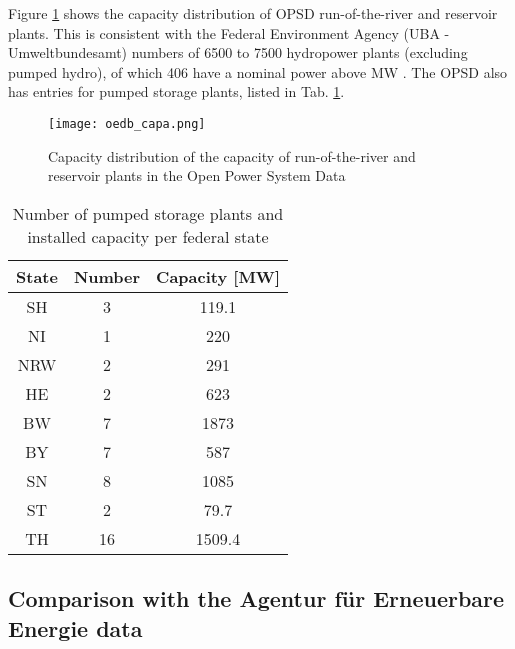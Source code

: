 Figure \ref{oedb_capa} shows the capacity distribution of OPSD run-of-the-river and reservoir plants. This is consistent with the Federal Environment Agency (UBA - Umweltbundesamt) numbers of 6500 to 7500 hydropower plants (excluding pumped hydro), of which 406 have a nominal power above \unit[1]{MW} \cite{uba_wasserkraft}. The OPSD also has entries for pumped storage plants, listed in Tab. \ref{oedb_pump}.

\begin{figure}[H]
\centering
\texttt{[image: oedb\_capa.png]}
\caption[Capacity distribution of run-of-the-river and reservoir plants in the Open Power System Data]{Capacity distribution of the capacity of run-of-the-river and reservoir plants in the Open Power System Data}
\label{oedb_capa}
\end{figure}

\begin{table} [H]
\footnotesize
  \centering
  \caption[Number of pumped storage plants and installed capacity per federal state]{Number of pumped storage plants and installed capacity per federal state \cite{oedb}}
  \label{oedb_pump}
  \begin{tabular}{|c|cc| }
  \hline
  \textbf{State} & Number 	& 	Capacity [\unit{MW}] 	\\
  \hline
  SH	&	3	&	119.1	\\
  NI	&	1	&	220	\\
  NRW	&	2	&	291	\\
  HE	&	2	&	623	\\
  BW	&	7	&	1873	\\	
  BY	&	7	&	587	\\
  SN	&	8	&	1085	\\
  ST	&	2	&	79.7	\\
  TH	&	16	&	1509.4	\\
  \hline
  \end{tabular}
\end{table}

\subsection{Comparison with the Agentur für Erneuerbare Energie data}
\label{sub:prod_data}

